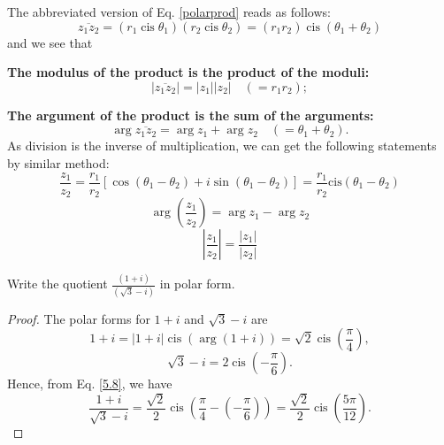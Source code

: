 The abbreviated version of Eq. \ref{polarprod} reads as follows:
\[
\overline{z_1z_2} = (r_1 \operatorname{cis} \theta_1)(r_2 \operatorname{cis} \theta_2) = (r_1r_2) \operatorname{cis} (\theta_1 + \theta_2)
\]
and we see that

\textbf{The modulus of the product is the product of the moduli:}
\[
|\overline{z_1z_2}| = |z_1||z_2| \quad (= r_1r_2);
\]


\textbf{The argument of the product is the sum of the arguments:}
\[
\arg \overline{z_1z_2} = \arg z_1 + \arg z_2 \quad (= \theta_1 + \theta_2).
\]
As division is the inverse of multiplication, we can get the following statements by similar method:
\begin{equation} \label{5.8}
    \frac{z_{1}}{z_{2}}=\frac{r_{1}}{r_{2}}\left[\cos\left(\theta_{1}-\theta_{2}\right)+i\sin\left(\theta_{1}-\theta_{2}\right)\right]=\frac{r_{1}}{r_{2}}\mathrm{cis}\left(\theta_{1}-\theta_{2}\right)
\end{equation}
\begin{equation}\label{5.9}
    \arg\left(\frac{z_{1}}{z_{2}}\right)=\arg z_{1}-\arg z_{2} 
\end{equation}
\begin{equation}\label{5.10}
    \left|\frac{z_1}{z_2}\right|=\frac{|z_1|}{|z_2|}
\end{equation}
\begin{example}
    Write the quotient \( \frac{(1 + i)}{(\sqrt{3} - i)} \) in polar form.
\end{example}
\begin{proof}
    The polar forms for \( 1 + i \) and \( \sqrt{3} - i \) are
    \[
    1 + i = |1 + i| \operatorname{cis}(\arg(1 + i)) = \sqrt{2} \operatorname{cis}\left(\frac{\pi}{4}\right),
    \]
    \[
    \sqrt{3} - i = 2 \operatorname{cis}\left(-\frac{\pi}{6}\right).
    \]
    Hence, from Eq. \ref{5.8}, we have
    \[
    \frac{1 + i}{\sqrt{3} - i} = \frac{\sqrt{2}}{2} \operatorname{cis} \left(\frac{\pi}{4} - \left(-\frac{\pi}{6}\right)\right) = \frac{\sqrt{2}}{2} \operatorname{cis}\left(\frac{5\pi}{12}\right).
    \]
    \end{proof}

